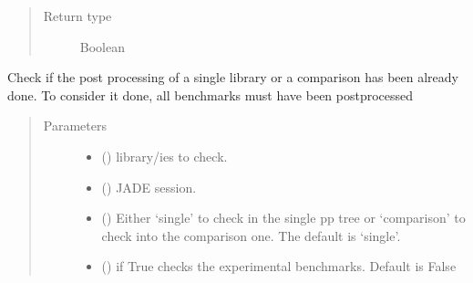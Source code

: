 \documentclass[letterpaper,10pt,english]{sphinxmanual}
\begin{document}
\begin{fulllineitems}
\begin{fulllineitems}
\begin{quote}
\begin{description}
\item[{Return type}] \leavevmode
Boolean

\end{description}\end{quote}

\end{fulllineitems}


\begin{fulllineitems}
\label{\detokenize{api/initobjects:status.Status.check_pp_single}}
Check if the post processing of a single library or a comparison has
been already done. To consider it done, all benchmarks must have been
post\sphinxhyphen{}processed
\begin{quote}\begin{description}
\item[{Parameters}] \leavevmode\begin{itemize}
\item {} 
 () \textendash{} library/ies to check.

\item {} 
 ({\hyperref[\detokenize{api/initobjects:main.Session}]{}}) \textendash{} JADE session.

\item {} 
 (\sphinxstyleliteralemphasis{\sphinxupquote{, }}) \textendash{} Either ‘single’ to check in the single pp tree or ‘comparison’
to check into the comparison one. The default is ‘single’.

\item {} 
 () \textendash{} if True checks the experimental benchmarks. Default is False

\end{itemize}


\end{description}
\end{quote}
\end{fulllineitems}
\end{fulllineitems}
\end{document}
